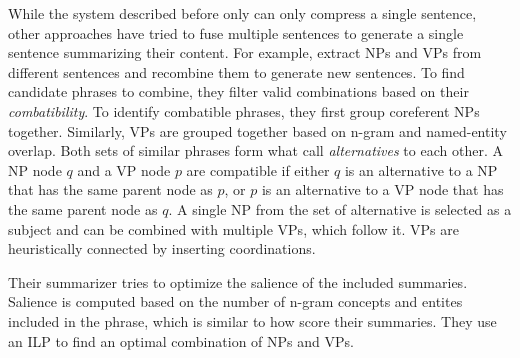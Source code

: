 \documentclass[a4paper,BCOR=10mm]{report}
\numberwithin{lemma}{chapter}
\numberwithin{definition}{chapter}
\begin{document}




While the system described before only can only compress a single sentence, other approaches have tried to fuse multiple sentences to generate a single sentence summarizing their content.
For example, \citet{bing} extract NPs and VPs from different sentences and recombine them to generate new sentences.
To find candidate phrases to combine, they filter valid combinations based on their \textit{combatibility}. To identify combatible phrases, they first group coreferent NPs together. Similarly, VPs are grouped together based on n-gram and named-entity overlap. Both sets of similar phrases form what \citeauthor{bing} call \textit{alternatives} to each other. A NP node $q$ and a VP node $p$ are compatible if either $q$ is an alternative to a NP that has the same parent node as $p$, or $p$ is an alternative to a VP node that has the same parent node as $q$. A single NP from the set of alternative is selected as a subject and can be combined with multiple VPs, which follow it. VPs are heuristically connected by inserting coordinations.

Their summarizer tries to optimize the salience of the included summaries. Salience is computed based on the number of n-gram concepts and entites included in the phrase, which is similar to how \citet{berg-kirkpatrick} score their summaries.
They use an ILP to find an optimal combination of NPs and VPs.
\end{document}
